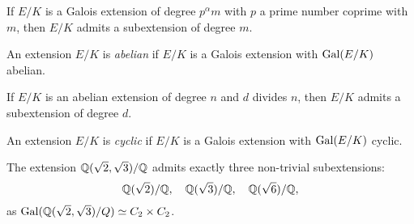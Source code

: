 \begin{exercise}
\label{xca:Sylow+Galois}
    If $E/K$ is a Galois extension of degree $p^\alpha m$ with
    $p$ a prime number coprime with $m$, then $E/K$ admits 
    a subextension of degree $m$. 
\end{exercise}

\begin{definition}
    An extension $E/K$ is \emph{abelian} if $E/K$ is a Galois extension
    with $\operatorname{Gal}(E/K)$ abelian.
\end{definition}

\begin{exercise}
    If $E/K$ is an abelian extension of degree $n$ and $d$ divides
    $n$, then $E/K$ admits a subextension of degree $d$. 
\end{exercise}

\begin{definition}
    An extension $E/K$ is \emph{cyclic} if $E/K$ is 
    a Galois extension with $\operatorname{Gal}(E/K)$ cyclic. 
\end{definition}

\begin{example}
    The extension $\mathbb{Q}(\sqrt{2},\sqrt{3})/\mathbb{Q}$ admits
    exactly three non-trivial subextensions: 
    \[
    \mathbb{Q}(\sqrt{2})/\mathbb{Q},
    \quad
    \mathbb{Q}(\sqrt{3})/\mathbb{Q},
    \quad 
    \mathbb{Q}(\sqrt{6})/\mathbb{Q},
    \]
    as $\operatorname{Gal}(\mathbb{Q}(\sqrt{2},\sqrt{3})/Q)\simeq C_2\times C_2$. 
\end{example}

